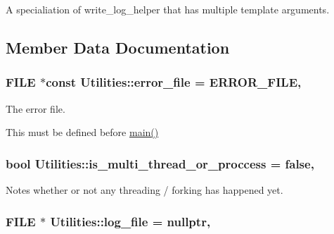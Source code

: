 A specialiation of write\+\_\+log\+\_\+helper that has multiple template arguments. 



\subsection{Member Data Documentation}
\subsubsection[{\texorpdfstring{error\+\_\+file}{error_file}}]{\setlength{\rightskip}{0pt plus 5cm}F\+I\+LE $\ast$const Utilities\+::error\+\_\+file = {\bf E\+R\+R\+O\+R\+\_\+\+F\+I\+LE}\hspace{0.3cm}{\ttfamily [static]}, {\ttfamily [private]}}\hypertarget{class_utilities_afc3b1cf892b76cede8fa87bfdd17533c}{}\label{class_utilities_afc3b1cf892b76cede8fa87bfdd17533c}


The error file. 

This must be defined before \hyperlink{shadow__stack_8cpp_a0ddf1224851353fc92bfbff6f499fa97}{main()} 
\subsubsection[{\texorpdfstring{is\+\_\+multi\+\_\+thread\+\_\+or\+\_\+proccess}{is_multi_thread_or_proccess}}]{\setlength{\rightskip}{0pt plus 5cm}bool Utilities\+::is\+\_\+multi\+\_\+thread\+\_\+or\+\_\+proccess = false\hspace{0.3cm}{\ttfamily [static]}, {\ttfamily [private]}}\hypertarget{class_utilities_af893d8dcd5bb1ba3fc72fc108536bcbc}{}\label{class_utilities_af893d8dcd5bb1ba3fc72fc108536bcbc}


Notes whether or not any threading / forking has happened yet. 

\subsubsection[{\texorpdfstring{log\+\_\+file}{log_file}}]{\setlength{\rightskip}{0pt plus 5cm}F\+I\+LE $\ast$ Utilities\+::log\+\_\+file = nullptr\hspace{0.3cm}{\ttfamily [static]}, {\ttfamily [private]}}\hypertarget{class_utilities_a63ce9d08b6459cd102bb368a274aca07}{}\label{class_utilities_a63ce9d08b6459cd102bb368a274aca07}


